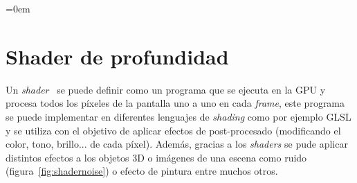 \parindent=0em
\section{Shader de profundidad}
\noindent

Un \textit{shader}~\cite{thebookofshaders} se puede definir como un programa que se ejecuta en la GPU y procesa todos los píxeles de la pantalla uno a uno en cada \textit{frame}, este programa se puede implementar en diferentes lenguajes de \textit{shading} como por ejemplo GLSL y se utiliza con el objetivo de aplicar efectos de post-procesado (modificando el color, tono, brillo... de cada píxel). Además, gracias a los \textit{shaders} se pude aplicar distintos efectos a los objetos 3D o imágenes de una escena como ruido (figura~\ref{fig:shadernoise}) o efecto de pintura entre muchos otros.

